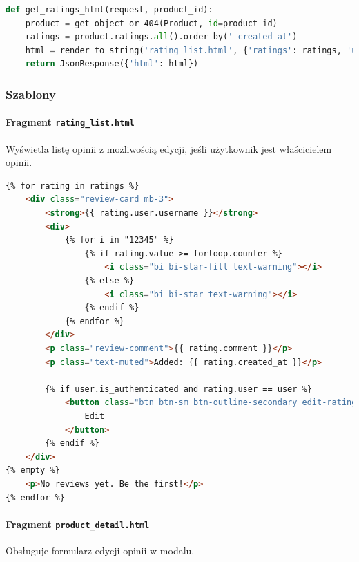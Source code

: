 \documentclass[12pt,a4paper,oneside]{article}
\theoremstyle{definition}
\numberwithin{equation}{section}
\begin{document}
\begin{lstlisting}[language=Python, caption=Widok \texttt{get\_ratings\_html}]
def get_ratings_html(request, product_id):
    product = get_object_or_404(Product, id=product_id)
    ratings = product.ratings.all().order_by('-created_at')
    html = render_to_string('rating_list.html', {'ratings': ratings, 'user': request.user})
    return JsonResponse({'html': html})
\end{lstlisting}



\subsubsection{Szablony}

\paragraph{Fragment \texttt{rating\_list.html}}
Wyświetla listę opinii z możliwością edycji, jeśli użytkownik jest właścicielem opinii.

\begin{lstlisting}[language=HTML, caption=Szablon \texttt{rating\_list.html}]
{% for rating in ratings %}
    <div class="review-card mb-3">
        <strong>{{ rating.user.username }}</strong>
        <div>
            {% for i in "12345" %}
                {% if rating.value >= forloop.counter %}
                    <i class="bi bi-star-fill text-warning"></i>
                {% else %}
                    <i class="bi bi-star text-warning"></i>
                {% endif %}
            {% endfor %}
        </div>
        <p class="review-comment">{{ rating.comment }}</p>
        <p class="text-muted">Added: {{ rating.created_at }}</p>

        {% if user.is_authenticated and rating.user == user %}
            <button class="btn btn-sm btn-outline-secondary edit-rating-btn" data-rating-id="{{ rating.id }}">
                Edit
            </button>
        {% endif %}
    </div>
{% empty %}
    <p>No reviews yet. Be the first!</p>
{% endfor %}
\end{lstlisting}

\paragraph{Fragment \texttt{product\_detail.html}}
Obsługuje formularz edycji opinii w modalu.
\end{document}
